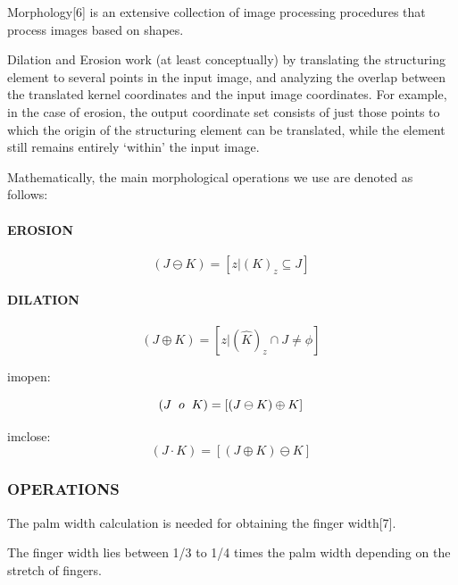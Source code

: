 \documentclass[conference]{IEEEtran}
\begin{document}
Morphology[6] is an extensive collection of image processing procedures that process images based on shapes.

 Dilation and Erosion work (at least conceptually) by translating the structuring element to several points in the input image, and analyzing the overlap between the translated kernel coordinates and the input image coordinates. For example, in the case of erosion, the output coordinate set consists of just those points to which the origin of the structuring element can be translated, while the element still remains entirely `within' the input image.

Mathematically, the main morphological operations we use are denoted as follows:

\paragraph{EROSION}
\[
    \left(J \ominus K\right) = \left[z|(K)_z\subseteq J \right]\,
\]

\paragraph{DILATION}
\[
    \left(J \oplus K\right) =  \left[z|(\widehat{K})_z\cap J \neq \phi \right]\,
\]

imopen:

\[
    \left(J \hspace{2mm} o\hspace{2mm} K\right) =  \left[\left(J \ominus K \right) \oplus K \right]\,
\]

imclose:
\[
    \left(J  \cdot  K\right) =  \left[\left(J \oplus K \right) \ominus K \right]\,
\]


\subsubsection{OPERATIONS}
The palm width calculation is needed for obtaining the finger width[7].

The finger width lies between 1/3 to 1/4 times the palm width depending on the stretch of fingers.
\end{document}
